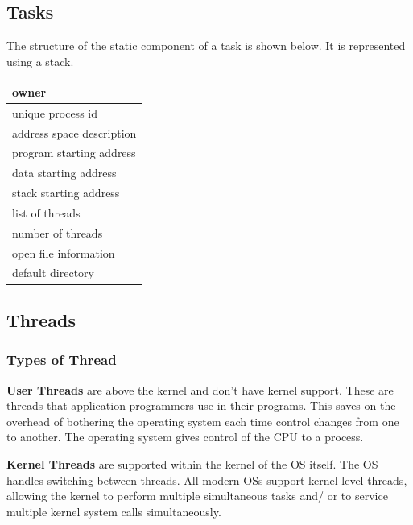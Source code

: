 \subsection*{Tasks}
The structure of the static component of a task is shown below. It is represented using a stack.
\begin{table}[H]
    \centering
    \begin{tabular}{|p{}|}
        \hline
        owner\\
        \hline
        unique process id\\
        \hline
        address space description\\
        \hline
        program starting address\\
        \hline
        data starting address\\
        \hline
        stack starting address\\
        \hline
        list of threads\\
        \hline
        number of threads\\
        \hline
        open file information\\
        \hline
        default directory\\ 
        \hline
    \end{tabular}
\end{table}

\subsection*{Threads}

\subsubsection*{Types of Thread}
\textbf{User Threads} are above the kernel and don't have kernel support. These are threads that application programmers use in their programs. This saves on the overhead of bothering the operating system each time control changes from one to another. The operating system gives control of the CPU to a process.

\textbf{Kernel Threads} are supported within the kernel of the OS itself. The OS handles switching between threads. All modern OSs support kernel level threads, allowing the kernel to perform multiple simultaneous tasks and/ or to service multiple kernel system calls simultaneously. 

